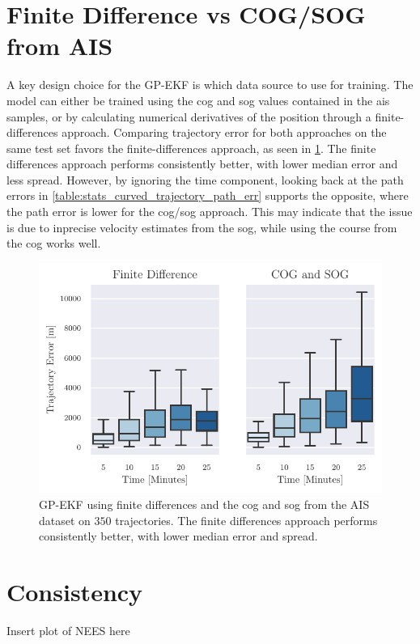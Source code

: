 \section{Finite Difference vs COG/SOG from AIS}
A key design choice for the GP-EKF is which data source to use for training. The model can either be trained using the \acrshort{cog} and \acrshort{sog} values contained in the \acrshort{ais} samples, or by calculating numerical derivatives of the position through a finite-differences approach. Comparing trajectory error for both approaches on the same test set favors the finite-differences approach, as seen in \cref{fig:stats_curved_gp_ekf_fd_vs_cog}. The finite differences approach performs consistently better, with lower median error and less spread. However, by ignoring the time component, looking back at the path errors in \cref{table:stats_curved_trajectory_path_err} supports the opposite, where the path error is lower for the \acrshort{cog}/\acrshort{sog} approach. This may indicate that the issue is due to inprecise velocity estimates from the \acrshort{sog}, while using the course from the \acrshort{cog} works well.
\begin{figure}[h]
    \centering
    \includegraphics{figures/curved_line_stats/gp_cog_vs_fd.pdf}
    \caption{GP-EKF using finite differences and the \acrshort{cog} and \acrshort{sog} from the AIS dataset on $350$ trajectories. The finite differences approach performs consistently better, with lower median error and spread.}
    \label{fig:stats_curved_gp_ekf_fd_vs_cog}
\end{figure}




\section{Consistency}
Insert plot of NEES here


